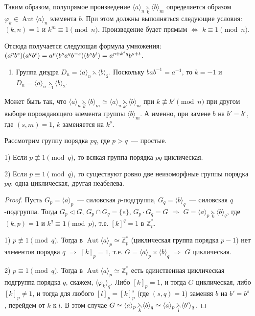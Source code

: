 \documentclass[a4paper]{article}
\newcommand{\Aut}{\mathop{\mathrm{Aut}}\nolimits}
\newcommand*{\p}[1]{#1\nobreak\discretionary{}{\hbox{$\mathsurround=0pt #1$}}{}}
\begin{document}
Таким образом, полупрямое произведение $\langle
a\rangle_n\mathop{\leftthreetimes}\limits_k\langle b\rangle_m$
определяется образом $\varphi_k\in\Aut\langle a\rangle_n$ элемента
$b$. При этом должны выполняться следующие условия: $(k,n)=1$ и
$k^m\equiv 1\pmod{n}$. Произведение будет прямым $\Leftrightarrow$
$k\equiv 1\pmod{n}$.

Отсюда получается следующая формула умножения:
$(a^pb^s)(a^qb^t)\p=a^p(b^sa^qb^{-s})(b^sb^t)=a^{p+k^sq}b^{s+t}$.

\prim
\begin{enumerate}
  \item Группа диэдра $D_n=\langle a\rangle_n\leftthreetimes \langle
  b\rangle_2$. Поскольку $bab^{-1}=a^{-1}$, то $k=-1$ и $D_n=\langle a\rangle_n
  \mathop{\leftthreetimes}\limits_{-1} \langle b\rangle_2$.
\end{enumerate}

\begin{zam}
Может быть так, что $\langle
a\rangle_n\mathop{\leftthreetimes}\limits_{k}\langle
b\rangle_m\simeq \langle
a\rangle_n\mathop{\leftthreetimes}\limits_{k'}\langle b\rangle_m$
при $k\not\equiv k'\pmod{n}$ при другом выборе порождающего элемента
группы $\langle b\rangle_m$. А име\-нно, при замене $b$ на $b'=b^s$,
где $(s,m)=1$, $k$ заменяется на $k^s$.
\end{zam}

Рассмотрим группу порядка $pq$, где $p>q$~--- простые.

\begin{theorem}
1) Если $p\not\equiv 1\pmod{q}$, то всякая группа порядка $pq$
циклическая.

2) Если $p\equiv 1\pmod{q}$, то существуют ровно две неизоморфные
группы порядка $pq$: одна циклическая, другая неабелева.
\end{theorem}

\begin{proof}
Пусть $G_p=\langle a\rangle_p$~--- силовская $p$-подгруппа,
$G_q=\langle b\rangle_q$~--- силовская $q$-подгруппа. Тогда
$G_p\triangleleft G$, $G_p\cap G_q=\{e\}$, $G_p\cdot G_q=G$
$\Rightarrow$ $G=\langle
a\rangle_p\mathop{\leftthreetimes}\limits_k\langle b\rangle_q$, где
$(k,p)=1$ и $k^q\equiv1\pmod{p}$, т.е. $[k]^q=1$ в $\mathbb{Z}^*_p$.

1) $p\not\equiv 1\pmod{q}$. Тогда в $\Aut\langle
a\rangle_p\simeq\mathbb{Z}^*_p$ (циклическая группа порядка $p-1$)
нет элементов порядка $q$ $\Rightarrow$ $[k]_p=1$, т.е. $G=\langle
a\rangle_p\times\langle b\rangle_q$ $\Rightarrow$ $G$ циклическая.

2) $p\equiv 1\pmod{q}$. Тогда в $\Aut\langle
a\rangle_p\simeq\mathbb{Z}^*_p$ есть единственная циклическая
подгруппа порядка $q$, скажем, $\langle\varphi_k\rangle_q$. Либо
$[k]_p=1$, и тогда $G$ циклическая, либо $[k]_p\neq 1$, и тогда для
любого $[l]_p=[k]_p^s$ (где $(s,q)=1$) заменяя $b$ на $b'=b^s$,
перейдем от $k$ к $l$. В этом случае  $G\simeq\langle
a\rangle_p\mathop{\leftthreetimes}\limits_k\langle b\rangle_q
\p\simeq\langle a\rangle_p\mathop{\leftthreetimes}\limits_l\langle
b'\rangle_q$.
\end{proof}
\end{document}

